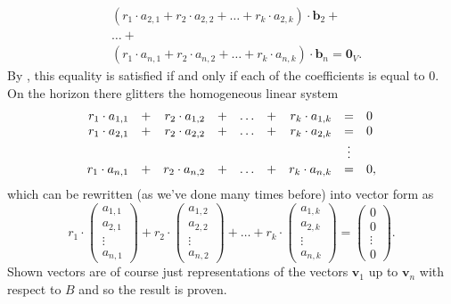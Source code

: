 \begin{lemproof}
\begin{align*}
  &(r_1 \cdot a_{2,1} + r_2 \cdot a_{2,2} + \ldots + r_k \cdot a_{2,k}) \cdot
  \mathbf{b}_2+\\
  &\ldots+\\
  &(r_1 \cdot a_{n,1} + r_2 \cdot a_{n,2} + \ldots + r_k \cdot a_{n,k}) \cdot
  \mathbf{b}_n = \mathbf{0}_V.
 \end{align*}
 By , this equality is
 satisfied if and only if each of the coefficients is equal to $0$. On the
 horizon there glitters the homogeneous linear system
 \[
  \begin{array}{r c r c r c r c l}
   r_1 \cdot a_{1,1} & + & r_2 \cdot a_{1,2} & + & \ldots & + & r_k \cdot
   a_{1,k} & = & 0\\
   r_1 \cdot a_{2,1} & + & r_2 \cdot a_{2,2} & + & \ldots & + & r_k \cdot
   a_{2,k} & = & 0\\
    & & & & & & & \vdots &\\
   r_1 \cdot a_{n,1} & + & r_2 \cdot a_{n,2} & + & \ldots & + & r_k \cdot
   a_{n,k} & = & 0,
  \end{array}
 \]
 which can be rewritten (as we've done many times before) into vector form as
 \[
  r_1 \cdot 
  \begin{pmatrix}
   a_{1,1}\\
   a_{2,1}\\
   \vdots\\
   a_{n,1}
  \end{pmatrix}
  + r_2 \cdot 
  \begin{pmatrix}
   a_{1,2}\\
   a_{2,2}\\
   \vdots\\
   a_{n,2}
  \end{pmatrix}
  + \ldots + r_k \cdot 
  \begin{pmatrix}
   a_{1,k}\\
   a_{2,k}\\
   \vdots\\
   a_{n,k}
  \end{pmatrix} = 
  \begin{pmatrix}
   0\\
   0\\
   \vdots\\
   0
  \end{pmatrix}.
 \]
 Shown vectors are of course just representations of the vectors $\mathbf{v}_1$
 up to $\mathbf{v}_n$ with respect to $B$ and so the result is proven.
\end{lemproof}
